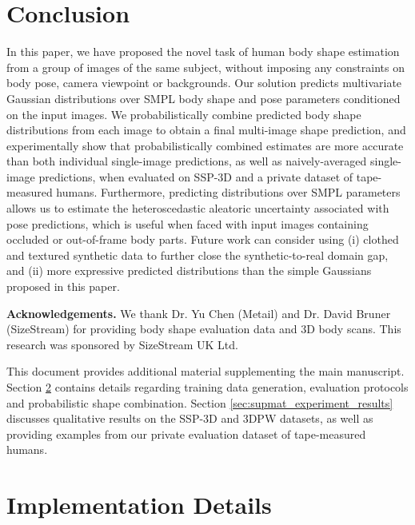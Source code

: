 \documentclass[final]{cvpr}
\begin{document}
\section{Conclusion}
In this paper, we have proposed the novel task of human body shape estimation from a group of images of the same subject, without imposing any constraints on body pose, camera viewpoint or backgrounds. Our solution predicts multivariate Gaussian distributions over SMPL \cite{SMPL:2015} body shape and pose parameters conditioned on the input images. We probabilistically combine predicted body shape distributions from each image to obtain a final multi-image shape prediction, and experimentally show that probabilistically combined estimates are more accurate than both individual single-image predictions, as well as naively-averaged single-image predictions, when evaluated on SSP-3D and a private dataset of tape-measured humans. Furthermore, predicting distributions over SMPL parameters allows us to estimate the heteroscedastic aleatoric uncertainty associated with pose predictions, which is useful when faced with input images containing occluded or out-of-frame body parts. Future work can consider using (i) clothed and textured synthetic data to further close the synthetic-to-real domain gap, and (ii) more expressive predicted distributions than the simple Gaussians proposed in this paper.

\noindent \textbf{Acknowledgements.} We thank Dr. Yu Chen (Metail) and Dr. David Bruner (SizeStream) for providing body shape evaluation data and 3D body scans. This research was sponsored by SizeStream UK Ltd.

\clearpage

\noindent This document provides additional material supplementing the main manuscript. Section \ref{sec:supmat_implementation_details} contains details regarding training data generation, evaluation protocols and probabilistic shape combination. Section \ref{sec:supmat_experiment_results} discusses qualitative results on the SSP-3D \cite{STRAPS2020BMVC} and 3DPW \cite{vonMarcard2018} datasets, as well as providing examples from our private evaluation dataset of tape-measured humans.

\section{Implementation Details}
\label{sec:supmat_implementation_details}
\end{document}
